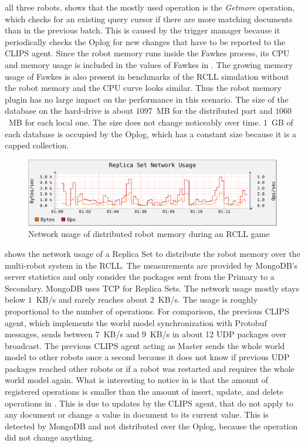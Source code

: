 all three robots.  shows that the mostly
used operation is the \emph{Getmore} operation, which checks for an
existing query cursor if there are more matching documents than in the
previous batch. This is caused by the trigger manager because it
periodically checks the Oplog for new changes that have to be reported
to the CLIPS agent. Since the robot memory runs inside the Fawkes
process, its CPU and memory usage is included in the values of Fawkes
in . The growing memory usage of Fawkes is
also present in benchmarks of the RCLL simulation without the robot
memory and the CPU curve looks similar. Thus the robot memory plugin
has no large impact on the performance in this scenario.
The size of the database on the hard-drive is about $1097$~MB for the
distributed part and $1060$~MB for each local one. The size does not
change noticeably over time. $1$~GB of each database is occupied by the
Oplog, which has a constant size because it is a capped collection.

\begin{figure}
  \centering
  \includegraphics[width=\textwidth]{plots/rsnetwork}
  \caption[Network usage of distributed robot memory during an RCLL game]{Network usage of distributed robot memory during an RCLL game}
  \label{fig:rcll-network}
\end{figure}
 shows the network usage of a Replica Set to
distribute the robot memory over the multi-robot system in the
RCLL. The measurements are provided by MongoDB's server statistics and
only consider the packages sent from the Primary to a
Secondary. MongoDB uses TCP for Replica Sets. The
network usage mostly stays below $1$~KB/s and rarely
reaches about $2$~KB/s. The usage is roughly proportional to
the number of operations. For comparison, the previous CLIPS agent,
which implements the world model synchronization with Protobuf
messages, sends between $7$~KB/s and $9$~KB/s in about
12 UDP packages over broadcast. The previous CLIPS agent acting as
Master sends the whole world model to other robots once a second
because it does not know if previous UDP packages reached other robots
or if a robot was restarted and requires the whole world model again.
 What is interesting to notice in  is that
the amount of registered operations is smaller than the amount of
insert, update, and delete operations in . This
is due to updates by the CLIPS agent, that do not apply to any
document or change a value in document to its current value. This is
detected by MongoDB and not distributed over the Oplog, because the
operation did not change anything.

